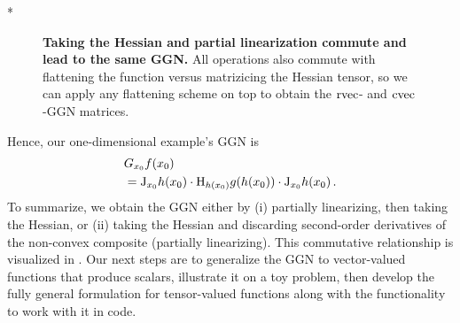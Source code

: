 \switchcolumn[1]*
\begin{figure}[!h]
  \centering
  \caption{\textbf{Taking the Hessian and partial linearization commute and lead to the same GGN.}
    All operations also commute with flattening the function versus matrizicing the Hessian tensor, so we can apply any flattening scheme on top to obtain the $\operatorname{rvec}$- and $\operatorname{cvec}$-GGN matrices.}\label{fig:commutative-diagram-ggn}
\end{figure}
\switchcolumn[0]

Hence, our one-dimensional example's GGN is
\begin{align*}
  &G_{x_0} f(x_0)
  \\
  &=\mathrm{J}_{x_0} h(x_0) \cdot \mathrm{H}_{h(x_0)} g(h(x_0)) \cdot \mathrm{J}_{x_0} h(x_0)\,.
\end{align*}
To summarize, we obtain the GGN either by (i) partially linearizing, then taking the Hessian, or (ii) taking the Hessian and discarding second-order derivatives of the non-convex composite (\ie partially linearizing).
This commutative relationship is visualized in .
Our next steps are to generalize the GGN to vector-valued functions that produce scalars, illustrate it on a toy problem, then develop the fully general formulation for tensor-valued functions along with the functionality to work with it in code.

